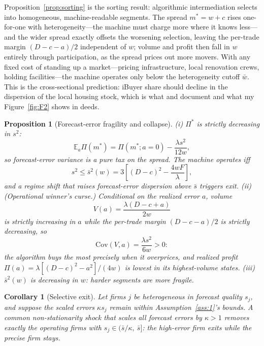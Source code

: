 \documentclass[12pt, letterpaper]{article}
\newtheorem{proposition}{Proposition}
\newtheorem{corollary}{Corollary}
\theoremstyle{remark}
\newcommand{\E}{\mathbb{E}}
\newcommand{\Cov}{\mathrm{Cov}}
\begin{document}
Proposition~\ref{prop:sorting} is the sorting result: algorithmic intermediation selects into homogeneous, machine-readable segments. The spread $m^* = w + c$ rises one-for-one with heterogeneity---the machine must charge more where it knows less---and the wider spread exactly offsets the worsening selection, leaving the per-trade margin $(D - c - a)/2$ independent of $w$; volume and profit then fall in $w$ entirely through participation, as the spread prices out more movers. With any fixed cost of standing up a market---pricing infrastructure, local renovation crews, holding facilities---the machine operates only below the heterogeneity cutoff $\bar w$. This is the cross-sectional prediction: iBuyer share should decline in the dispersion of the local housing stock, which is what \citet{buchak2025intermediating} and \citet{seiler2023burgeoning} document and what my Figure~\ref{fig:F2} shows in deeds.

\begin{proposition}[Forecast-error fragility and collapse]\label{prop:fragility}
(i) $\Pi^*$ is strictly decreasing in $s^2$:
\begin{equation}
\E_a \Pi(m^*) = \Pi(m^*; a = 0) - \frac{\lambda s^2}{12w},
\label{eq:errortax}
\end{equation}
so forecast-error variance is a pure tax on the spread. The machine operates iff
\begin{equation}
s^2 \le \bar s^2(w) = 3\left[ (D-c)^2 - \frac{4wF}{\lambda} \right],
\label{eq:sbar}
\end{equation}
and a regime shift that raises forecast-error dispersion above $\bar s$ triggers exit.
(ii) (Operational winner's curse.) Conditional on the realized error $a$, volume
\begin{equation}
V(a) = \frac{\lambda (D - c + a)}{2w}
\label{eq:condvolume}
\end{equation}
is strictly increasing in $a$ while the per-trade margin $(D - c - a)/2$ is strictly decreasing, so
\begin{equation}
\Cov(V, a) = \frac{\lambda s^2}{6w} > 0:
\label{eq:wcurse}
\end{equation}
the algorithm buys the most precisely when it overprices, and realized profit $\Pi(a) = \lambda[(D-c)^2 - a^2]/(4w)$ is lowest in its highest-volume states.
(iii) $\bar s^2(w)$ is decreasing in $w$: harder segments are more fragile.
\end{proposition}

\begin{corollary}[Selective exit]\label{cor:exit}
Let firms $j$ be heterogeneous in forecast quality $s_j$, and suppose the scaled errors $\kappa s_j$ remain within Assumption~\ref{ass:1}'s bounds. A common non-stationarity shock that scales all forecast errors by $\kappa > 1$ removes exactly the operating firms with $s_j \in (\bar s/\kappa,\ \bar s]$: the high-error firm exits while the precise firm stays.
\end{corollary}
\end{document}
